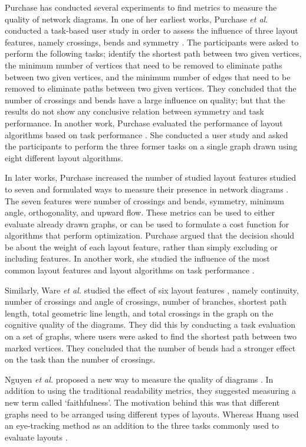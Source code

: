 \documentclass[a4paper,11pt,phdthesis,singlespace,twoside]{cssethesis}
\begin{document}
Purchase has conducted several experiments to find metrics to measure the quality of network diagrams. In one of her earliest works, Purchase \emph{et al.} conducted a task-based user study in order to assess the influence of three layout features, namely crossings, bends and symmetry \cite{purchase1996validating}. The participants were asked to perform the following tasks; identify the shortest path between two given vertices, the minimum number of vertices that need to be removed to eliminate paths between two given vertices, and the minimum number of edges that need to be removed to eliminate paths between two given vertices. They concluded that the number of crossings and bends have a large influence on quality; but that the results do not show any conclusive relation between symmetry and task performance. In another work, Purchase evaluated the performance of layout algorithms based on task performance \cite{purchase1998performance}. She conducted a user study and asked the participants to perform the three former tasks on a single graph drawn using eight different layout algorithms.

In later works, Purchase increased the number of studied layout features studied to seven and formulated ways to measure their presence in network diagrams \cite{purchase2002metrics}. The seven features were number of crossings and bends, symmetry, minimum angle, orthogonality, and upward flow. These metrics can be used to either evaluate already drawn graphs, or can be used to formulate a cost function for algorithms that perform optimization. Purchase argued that the decision should be about the weight of each layout feature, rather than simply excluding or including features. In another work, she studied the influence of the most common layout features and layout algorithms on task performance \cite{purchase2004evaluating}. 

Similarly, Ware \emph{et al.} studied the effect of six layout features \cite{ware2002cognitive}, namely continuity, number of crossings and angle of crossings, number of branches, shortest path length, total geometric line length, and total crossings in the graph on the cognitive quality of the diagrams. They did this by conducting a task evaluation on a set of graphs, where users were asked to find the shortest path between two marked vertices. They concluded that the number of bends had a stronger effect on the task than the number of crossings.

Nguyen \emph{et al.} proposed a new way to measure the quality of diagrams \cite{nguyen2013faithfulness}. In addition to using the traditional readability metrics, they suggested measuring a new term called `faithfulness'. The motivation behind this was that different graphs need to be arranged using different types of layouts. Whereas Huang used an eye-tracking method as an addition to the three tasks commonly used to evaluate layouts \cite{huang2007using}.
\end{document}
